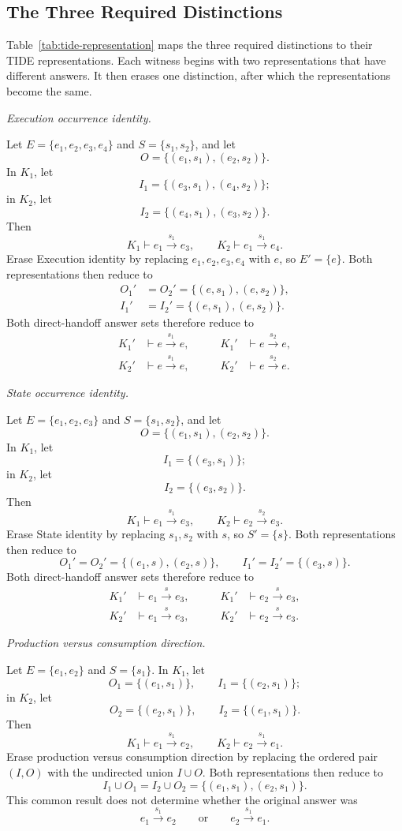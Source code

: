 \documentclass[conference]{IEEEtran}
\theoremstyle{tideproposition}
\newcommand{\direct}[3]{#1\xrightarrow{#2}#3}
\newcommand{\reviewitem}[1]{\par\addvspace{0.22\baselineskip}\noindent\emph{#1.}\ }
\begin{document}
\subsection{The Three Required Distinctions}
Table~\ref{tab:tide-representation} maps the three required distinctions to their TIDE representations. Each witness begins with two representations that have different answers. It then erases one distinction, after which the representations become the same.

\reviewitem{Execution occurrence identity}\par\nobreak
Let $E=\{e_1,e_2,e_3,e_4\}$ and $S=\{s_1,s_2\}$, and let
\[
O=\{(e_1,s_1),(e_2,s_2)\}.
\]
In $K_1$, let
\[
I_1=\{(e_3,s_1),(e_4,s_2)\};
\]
in $K_2$, let
\[
I_2=\{(e_4,s_1),(e_3,s_2)\}.
\]
Then
\[
K_1\vdash\direct{e_1}{s_1}{e_3},
\qquad
K_2\vdash\direct{e_1}{s_1}{e_4}.
\]
Erase Execution identity by replacing $e_1,e_2,e_3,e_4$ with $e$, so $E'=\{e\}$. Both representations then reduce to
\[
\begin{aligned}
O_1'&=O_2'=\{(e,s_1),(e,s_2)\},\\
I_1'&=I_2'=\{(e,s_1),(e,s_2)\}.
\end{aligned}
\]
Both direct-handoff answer sets therefore reduce to
\[
\begin{aligned}
K_1'&\vdash\direct{e}{s_1}{e},
&\qquad K_1'&\vdash\direct{e}{s_2}{e},\\
K_2'&\vdash\direct{e}{s_1}{e},
&\qquad K_2'&\vdash\direct{e}{s_2}{e}.
\end{aligned}
\]

\reviewitem{State occurrence identity}\par\nobreak
Let $E=\{e_1,e_2,e_3\}$ and $S=\{s_1,s_2\}$, and let
\[
O=\{(e_1,s_1),(e_2,s_2)\}.
\]
In $K_1$, let
\[
I_1=\{(e_3,s_1)\};
\]
in $K_2$, let
\[
I_2=\{(e_3,s_2)\}.
\]
Then
\[
K_1\vdash\direct{e_1}{s_1}{e_3},
\qquad
K_2\vdash\direct{e_2}{s_2}{e_3}.
\]
Erase State identity by replacing $s_1,s_2$ with $s$, so $S'=\{s\}$.
Both representations then reduce to
\[
O_1'=O_2'=\{(e_1,s),(e_2,s)\},
\qquad
I_1'=I_2'=\{(e_3,s)\}.
\]
Both direct-handoff answer sets therefore reduce to
\[
\begin{aligned}
K_1'&\vdash\direct{e_1}{s}{e_3},
&\qquad K_1'&\vdash\direct{e_2}{s}{e_3},\\
K_2'&\vdash\direct{e_1}{s}{e_3},
&\qquad K_2'&\vdash\direct{e_2}{s}{e_3}.
\end{aligned}
\]

\reviewitem{Production versus consumption direction}\par\nobreak
Let $E=\{e_1,e_2\}$ and $S=\{s_1\}$. In $K_1$, let
\[
O_1=\{(e_1,s_1)\},
\qquad
I_1=\{(e_2,s_1)\};
\]
in $K_2$, let
\[
O_2=\{(e_2,s_1)\},
\qquad
I_2=\{(e_1,s_1)\}.
\]
Then
\[
K_1\vdash\direct{e_1}{s_1}{e_2},
\qquad
K_2\vdash\direct{e_2}{s_1}{e_1}.
\]
Erase production versus consumption direction by replacing the ordered pair $(I,O)$ with the undirected union $I\cup O$. Both representations then reduce to
\[
I_1\cup O_1
=
I_2\cup O_2
=
\{(e_1,s_1),(e_2,s_1)\}.
\]
This common result does not determine whether the original answer was
\[
\direct{e_1}{s_1}{e_2}
\qquad\text{or}\qquad
\direct{e_2}{s_1}{e_1}.
\]
\end{document}
